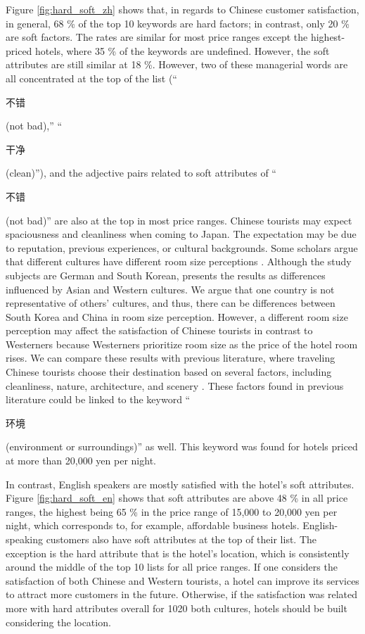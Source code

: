 \documentclass[smallextended,natbib]{svjour3}       %
\begin{document}
    Figure \ref{fig:hard_soft_zh} shows that, in regards to Chinese customer satisfaction, in general, 68 \% of the top 10 keywords are hard factors; in contrast, only 20 \% are soft factors. The rates are similar for most price ranges except the highest-priced hotels, where 35 \% of the keywords are undefined. However, the soft attributes are still similar at 18 \%. However, two of these managerial words are all concentrated at the top of the list (``\begin{CJK}{UTF8}{gbsn}不错\end{CJK} (not bad),'' ``\begin{CJK}{UTF8}{gbsn}干净\end{CJK} (clean)''), and the adjective pairs related to soft attributes of ``\begin{CJK}{UTF8}{gbsn}不错\end{CJK} (not bad)'' are also at the top in most price ranges. Chinese tourists may expect spaciousness and cleanliness when coming to Japan. The expectation may be due to reputation, previous experiences, or cultural backgrounds. Some scholars argue that different cultures have different room size perceptions \cite[][]{Saulton2017}. Although the study subjects are German and South Korean, \cite{Saulton2017} presents the results as differences influenced by Asian and Western cultures. We argue that one country is not representative of others’ cultures, and thus, there can be differences between South Korea and China in room size perception. However, a different room size perception may affect the satisfaction of Chinese tourists in contrast to Westerners because Westerners prioritize room size as the price of the hotel room rises. We can compare these results with previous literature, where traveling Chinese tourists choose their destination based on several factors, including cleanliness, nature, architecture, and scenery \cite[][]{ryan2001}. These factors found in previous literature could be linked to the keyword ``\begin{CJK}{UTF8}{gbsn}环境\end{CJK} (environment or surroundings)'' as well. This keyword was found for hotels priced at more than 20,000 yen per night. 

    In contrast, English speakers are mostly satisfied with the hotel's soft attributes. Figure \ref{fig:hard_soft_en} shows that soft attributes are above 48 \% in all price ranges, the highest being 65 \% in the price range of 15,000 to 20,000 yen per night, which corresponds to, for example, affordable business hotels. English-speaking customers also have soft attributes at the top of their list. The exception is the hard attribute that is the hotel's location, which is consistently around the middle of the top 10 lists for all price ranges. If one considers the satisfaction of both Chinese and Western tourists, a hotel can improve its services to attract more customers in the future. Otherwise, if the satisfaction was related more with hard attributes overall for 1020 both cultures, hotels should be built considering the location.
\end{document}
